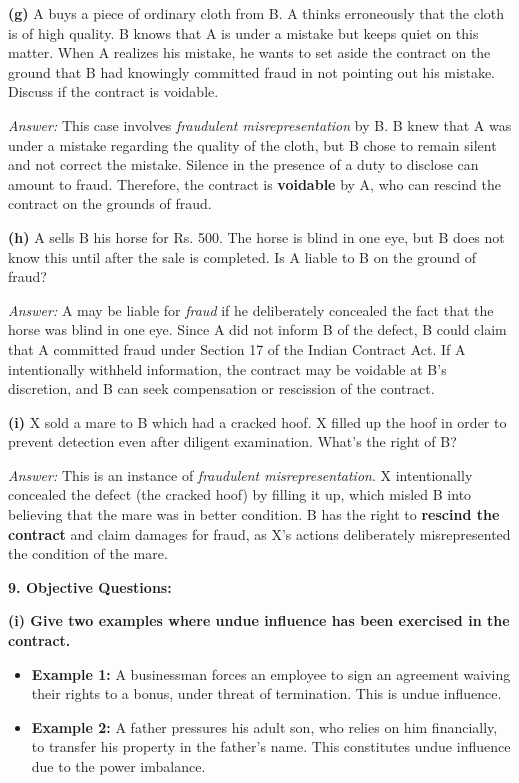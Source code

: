 \documentclass[12pt,a4paper]{book}
\begin{document}
\vspace{0.5cm}
\textbf{(g)} A buys a piece of ordinary cloth from B. A thinks erroneously that the cloth is of high quality. B knows that A is under a mistake but keeps quiet on this matter. When A realizes his mistake, he wants to set aside the contract on the ground that B had knowingly committed fraud in not pointing out his mistake. Discuss if the contract is voidable. 

\textit{Answer:}  
This case involves \textit{fraudulent misrepresentation} by B. B knew that A was under a mistake regarding the quality of the cloth, but B chose to remain silent and not correct the mistake. Silence in the presence of a duty to disclose can amount to fraud. Therefore, the contract is \textbf{voidable} by A, who can rescind the contract on the grounds of fraud.

\vspace{0.5cm}
\textbf{(h)} A sells B his horse for Rs. 500. The horse is blind in one eye, but B does not know this until after the sale is completed. Is A liable to B on the ground of fraud? 

\textit{Answer:}  
A may be liable for \textit{fraud} if he deliberately concealed the fact that the horse was blind in one eye. Since A did not inform B of the defect, B could claim that A committed fraud under Section 17 of the Indian Contract Act. If A intentionally withheld information, the contract may be voidable at B's discretion, and B can seek compensation or rescission of the contract.

\vspace{0.5cm}
\textbf{(i)} X sold a mare to B which had a cracked hoof. X filled up the hoof in order to prevent detection even after diligent examination. What's the right of B?  

\textit{Answer:}  
This is an instance of \textit{fraudulent misrepresentation}. X intentionally concealed the defect (the cracked hoof) by filling it up, which misled B into believing that the mare was in better condition. B has the right to \textbf{rescind the contract} and claim damages for fraud, as X's actions deliberately misrepresented the condition of the mare.

\vspace{1cm}

\textbf{9. Objective Questions:}

\textbf{(i) Give two examples where undue influence has been exercised in the contract.}

\begin{itemize}
    \item \textbf{Example 1:} A businessman forces an employee to sign an agreement waiving their rights to a bonus, under threat of termination. This is undue influence.
    \item \textbf{Example 2:} A father pressures his adult son, who relies on him financially, to transfer his property in the father’s name. This constitutes undue influence due to the power imbalance.
\end{itemize}
\end{document}

